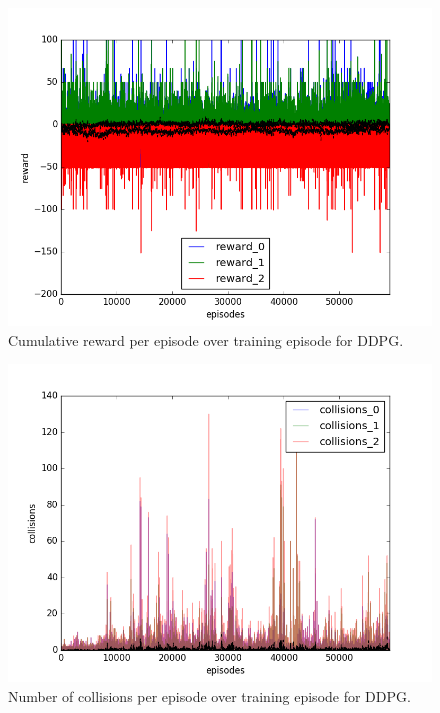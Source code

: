 \begin{figure}[h]
  \centering
  \includegraphics[trim=10 10 10 10,clip,width=\figscale\linewidth]
  {../results/ddpg_1vs2/reward.png}
  \caption{Cumulative reward per episode over training episode for DDPG.}
  \label{fig:ddpg-1vs2}
\end{figure}
\FloatBarrier


\begin{figure}[h]
  \centering
  \includegraphics[trim=10 10 10 10,clip,width=\figscale\linewidth]
  {../results/ddpg_1vs2/collisions.png}
  \caption{Number of collisions per episode over training episode for DDPG.}
  \label{fig:ddpg-1vs2}
\end{figure}
\FloatBarrier


